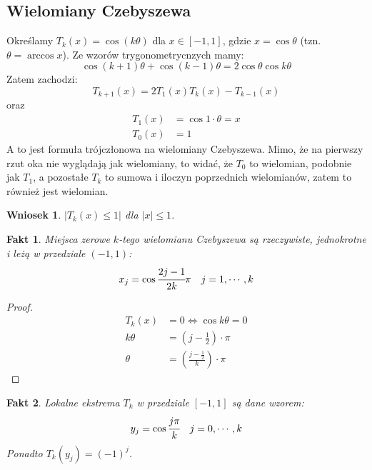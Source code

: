 \documentclass[hidelinks,a4paper,fleqn,oneside]{book}
\newtheorem{wniosek}{Wniosek}
\newtheorem{fakt}{Fakt}
\begin{document}
\subsection{Wielomiany Czebyszewa}

Określamy $T_k(x) = \cos(k\theta)$ dla $x \in [-1, 1]$, gdzie $x = \cos\theta$ (tzn. $\theta = \arccos x$). Ze wzorów trygonometrycnzych mamy:
\[
	\cos{(k+1)\theta} + \cos{(k-1)\theta} = 2\cos\theta\cos{k\theta}
\]
Zatem zachodzi:
\[
	T_{k+1}(x) = 2T_1(x)T_k(x)-T_{k-1}(x)
\]
oraz
\[
\begin{array}{ll}
	T_1(x) & = \cos{1\cdot\theta} = x \\
	T_0(x) & = 1
\end{array}
\]
A to jest formuła trójczłonowa na wielomiany Czebyszewa. Mimo, że na pierwszy rzut oka nie wyglądają jak wielomiany, to widać, że $T_0$ to wielomian, podobnie jak $T_1$, a pozostałe $T_k$ to sumowa i iloczyn poprzednich wielomianów, zatem to również jest wielomian.

\begin{wniosek}
$|T_k(x) \leq 1|$ dla $|x| \leq 1$.
\end{wniosek}

\begin{fakt}
Miejsca zerowe $k$-tego wielomianu Czebyszewa są rzeczywiste, jednokrotne i leżą w przedziale $(-1, 1)$:
\[
	x_j = \cos{\cfrac{2j-1}{2k}\pi} \quad j = 1, \cdots, k
\]
\end{fakt}

\begin{proof}
\[
\begin{array}{rl}
	T_k(x) & = 0 \iff \cos{k\theta} = 0 \\
	k\theta & = (j-\frac{1}{2})\cdot\pi \\
	\theta & = (\frac{j-\frac{1}{2}}{k})\cdot \pi
\end{array}
\]
\end{proof}

\begin{fakt}
	Lokalne ekstrema $T_k$ w przedziale $[-1, 1]$ są dane wzorem:
	\[
		y_j = \cos{\cfrac{j\pi}{k}}\quad j = 0, \cdots, k
	\]
	Ponadto $T_k(y_j) = (-1)^j$.
\end{fakt}

\end{document}
